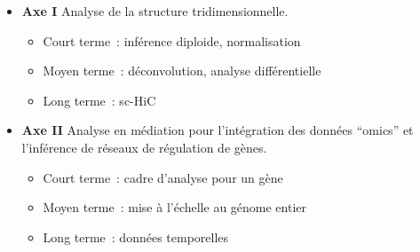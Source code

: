 \documentclass[11pt,xcolor=dvipsnames]{beamer}
\begin{document}
\begin{frame}
\begin{overlayarea}{12cm}{5cm}
\small
\begin{columns}
\begin{column}{0.7\linewidth}
\begin{itemize}[leftmargin=*]
\scriptsize
\item<4-> {\bf Axe I} \quad Analyse de la structure tridimensionnelle.
\begin{itemize}
\tiny
\item<4->[-] Court terme~: inférence diploide, normalisation
\item<4->[-] Moyen terme~: déconvolution, analyse
différentielle
\item<4->[-] Long terme~: sc-HiC
\end{itemize}
\item<5-> {\bf Axe II} \quad Analyse en médiation pour l'intégration des
données ``omics'' et l'inférence de réseaux de régulation de gènes.
\begin{itemize}
\tiny
\item<5->[-] Court terme~: cadre d'analyse pour un gène
\item<5->[-] Moyen terme~: mise à l'échelle au génome entier
\item<5->[-] Long terme~: données temporelles
\end{itemize}
\end{itemize}
\end{column}
\begin{column}{0.3\linewidth}
\begin{overlayarea}{0.9\linewidth}{2cm}
\end{overlayarea}
\end{column}
\end{columns}
\end{overlayarea}
\end{frame}
\end{document}
